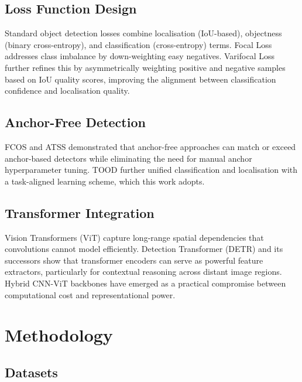 \documentclass[12pt, a4paper]{report}
\begin{document}
\section{Loss Function Design}

Standard object detection losses combine localisation (IoU-based), objectness 
(binary cross-entropy), and classification (cross-entropy) terms. Focal Loss 
\cite{lin2017focal} addresses class imbalance by down-weighting easy negatives. 
Varifocal Loss \cite{zhang2021varifocal} further refines this by asymmetrically 
weighting positive and negative samples based on IoU quality scores, 
improving the alignment between classification confidence and localisation quality.

\section{Anchor-Free Detection}

FCOS \cite{tian2019fcos} and ATSS \cite{zhang2020atss} demonstrated that 
anchor-free approaches can match or exceed anchor-based detectors while 
eliminating the need for manual anchor hyperparameter tuning. TOOD 
\cite{feng2021tood} further unified classification and localisation with a 
task-aligned learning scheme, which this work adopts.

\section{Transformer Integration}

Vision Transformers (ViT) \cite{dosovitskiy2020vit} capture long-range spatial 
dependencies that convolutions cannot model efficiently. Detection Transformer 
(DETR) \cite{carion2020detr} and its successors show that transformer encoders 
can serve as powerful feature extractors, particularly for contextual reasoning 
across distant image regions. Hybrid CNN-ViT backbones have emerged as a 
practical compromise between computational cost and representational power.

\chapter{Methodology}
\label{chap:methodology}

\section{Datasets}
\end{document}
